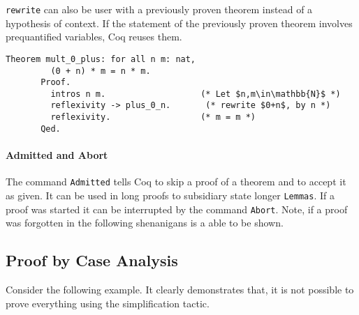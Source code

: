 	   \lstinline!rewrite!  can also be user with a previously proven theorem instead of a hypothesis of context.
	   If the statement of the previously proven theorem involves prequantified variables, Coq reuses them.   
	   \begin{lstlisting}[caption=\lstinline!mult_0_plus!]
	   Theorem mult_0_plus: for all n m: nat,
	     (0 + n) * m = n * m.
	   Proof.
	     intros n m.                   (* Let $n,m\in\mathbb{N}$ *) 
	     reflexivity -> plus_0_n.       (* rewrite $0+n$, by n *)
	     reflexivity.                  (* m = m *)
	   Qed.
	   \end{lstlisting}   
	
		\paragraph{Admitted and Abort}
		
		The command \lstinline!Admitted! tells Coq to skip a proof of a theorem and to accept it as given.
		It can be used in long proofs to subsidiary state longer \lstinline!Lemmas!.
		If a proof was started it can be interrupted by the command \lstinline!Abort!.
		Note, if a proof was forgotten in the following shenanigans is a able to be shown. \\
		
	\subsection{Proof by Case Analysis}
	   Consider the following example. It clearly demonstrates that, it is not possible to prove everything using the simplification tactic.   
	   
	   
